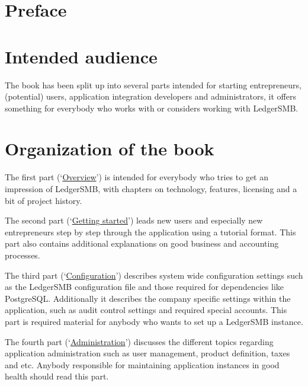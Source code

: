 \documentclass[10pt,a4paper]{book}
\begin{document}
\tableofcontents

\listoffigures

\listoftables

\cleardoublepage

\section*{Preface}
\label{preface}

\section*{Intended audience}
\label{sec-intended-audience}

The book has been split up into several parts intended for starting entrepreneurs,
(potential) users, application integration developers and
administrators, it offers something for everybody who works with or considers working with
LedgerSMB.

\section*{Organization of the book}
\label{sec-book-organization}

The first
part (\lq\hyperref[part-overview]{Overview}\rq) is intended for everybody who tries to get an impression of LedgerSMB, with
chapters on technology, features, licensing and a bit of project history.

The second part
(\lq\hyperref[part-getting-started]{Getting started}\rq) leads new users and especially new entrepreneurs step by step through the
application using a tutorial format. This part also contains additional explanations on good business and accounting
processes.

The third part (\lq\hyperref[part-configuration]{Configuration}\rq) describes system wide configuration settings such as
the LedgerSMB configuration file and those required for dependencies like PostgreSQL. Additionally
it describes the company specific settings within the application, such as audit control settings
and required special accounts. This part is required material for anybody who wants to set up
a LedgerSMB instance.

The fourth part (\lq\hyperref[part-administration]{Administration}\rq) discusses the different topics
regarding application administration such as user management, product definition, taxes and etc.
Anybody responsible for maintaining application instances in good health should read this part.
\end{document}

